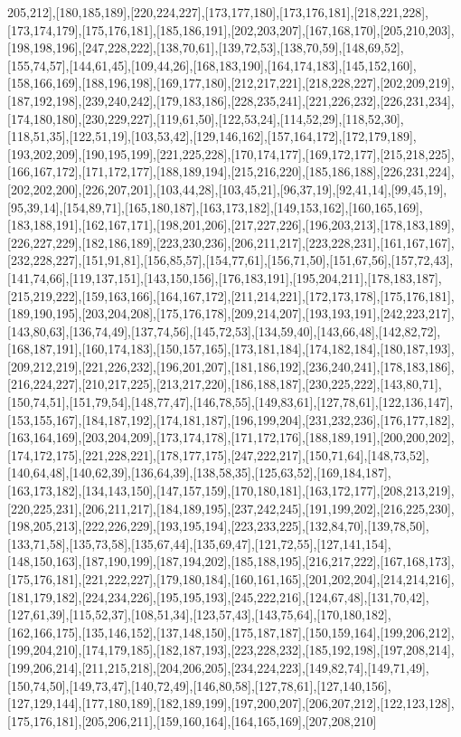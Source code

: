 205,212],[180,185,189],[220,224,227],[173,177,180],[173,176,181],[218,221,228],[173,174,179],[175,176,181],[185,186,191],[202,203,207],[167,168,170],[205,210,203],[198,198,196],[247,228,222],[138,70,61],[139,72,53],[138,70,59],[148,69,52],[155,74,57],[144,61,45],[109,44,26],[168,183,190],[164,174,183],[145,152,160],[158,166,169],[188,196,198],[169,177,180],[212,217,221],[218,228,227],[202,209,219],[187,192,198],[239,240,242],[179,183,186],[228,235,241],[221,226,232],[226,231,234],[174,180,180],[230,229,227],[119,61,50],[122,53,24],[114,52,29],[118,52,30],[118,51,35],[122,51,19],[103,53,42],[129,146,162],[157,164,172],[172,179,189],[193,202,209],[190,195,199],[221,225,228],[170,174,177],[169,172,177],[215,218,225],[166,167,172],[171,172,177],[188,189,194],[215,216,220],[185,186,188],[226,231,224],[202,202,200],[226,207,201],[103,44,28],[103,45,21],[96,37,19],[92,41,14],[99,45,19],[95,39,14],[154,89,71],[165,180,187],[163,173,182],[149,153,162],[160,165,169],[183,188,191],[162,167,171],[198,201,206],[217,227,226],[196,203,213],[178,183,189],[226,227,229],[182,186,189],[223,230,236],[206,211,217],[223,228,231],[161,167,167],[232,228,227],[151,91,81],[156,85,57],[154,77,61],[156,71,50],[151,67,56],[157,72,43],[141,74,66],[119,137,151],[143,150,156],[176,183,191],[195,204,211],[178,183,187],[215,219,222],[159,163,166],[164,167,172],[211,214,221],[172,173,178],[175,176,181],[189,190,195],[203,204,208],[175,176,178],[209,214,207],[193,193,191],[242,223,217],[143,80,63],[136,74,49],[137,74,56],[145,72,53],[134,59,40],[143,66,48],[142,82,72],[168,187,191],[160,174,183],[150,157,165],[173,181,184],[174,182,184],[180,187,193],[209,212,219],[221,226,232],[196,201,207],[181,186,192],[236,240,241],[178,183,186],[216,224,227],[210,217,225],[213,217,220],[186,188,187],[230,225,222],[143,80,71],[150,74,51],[151,79,54],[148,77,47],[146,78,55],[149,83,61],[127,78,61],[122,136,147],[153,155,167],[184,187,192],[174,181,187],[196,199,204],[231,232,236],[176,177,182],[163,164,169],[203,204,209],[173,174,178],[171,172,176],[188,189,191],[200,200,202],[174,172,175],[221,228,221],[178,177,175],[247,222,217],[150,71,64],[148,73,52],[140,64,48],[140,62,39],[136,64,39],[138,58,35],[125,63,52],[169,184,187],[163,173,182],[134,143,150],[147,157,159],[170,180,181],[163,172,177],[208,213,219],[220,225,231],[206,211,217],[184,189,195],[237,242,245],[191,199,202],[216,225,230],[198,205,213],[222,226,229],[193,195,194],[223,233,225],[132,84,70],[139,78,50],[133,71,58],[135,73,58],[135,67,44],[135,69,47],[121,72,55],[127,141,154],[148,150,163],[187,190,199],[187,194,202],[185,188,195],[216,217,222],[167,168,173],[175,176,181],[221,222,227],[179,180,184],[160,161,165],[201,202,204],[214,214,216],[181,179,182],[224,234,226],[195,195,193],[245,222,216],[124,67,48],[131,70,42],[127,61,39],[115,52,37],[108,51,34],[123,57,43],[143,75,64],[170,180,182],[162,166,175],[135,146,152],[137,148,150],[175,187,187],[150,159,164],[199,206,212],[199,204,210],[174,179,185],[182,187,193],[223,228,232],[185,192,198],[197,208,214],[199,206,214],[211,215,218],[204,206,205],[234,224,223],[149,82,74],[149,71,49],[150,74,50],[149,73,47],[140,72,49],[146,80,58],[127,78,61],[127,140,156],[127,129,144],[177,180,189],[182,189,199],[197,200,207],[206,207,212],[122,123,128],[175,176,181],[205,206,211],[159,160,164],[164,165,169],[207,208,210]